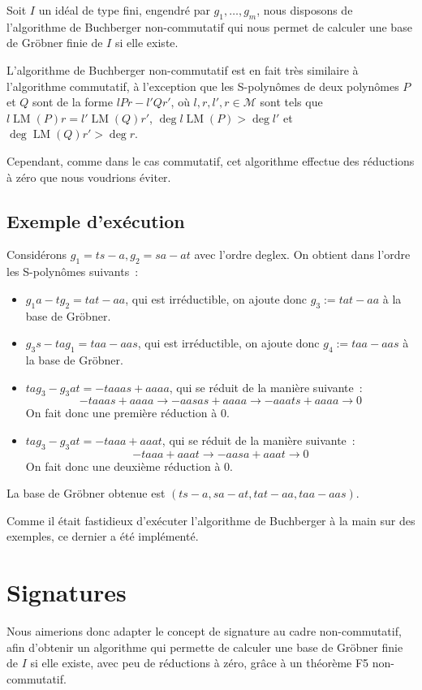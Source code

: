 \documentclass{article}
\newcommand{\M}{\mathcal{M}}
\DeclareMathOperator{\LM}{LM}
\begin{document}
Soit $I$ un idéal de type fini, engendré par $g_1, \dots, g_m$, nous disposons de l'algorithme de Buchberger non-commutatif qui nous permet de calculer une base de Gröbner finie de $I$ si elle existe. 

L'algorithme de Buchberger non-commutatif est en fait très similaire à l'algorithme commutatif, à l'exception que les S-polynômes de deux polynômes $P$ et $Q$ sont de la forme $lPr - l'Qr'$, où $l, r, l', r \in \M$ sont tels que $l\LM(P)r = l'\LM(Q)r'$, $\deg{l\LM(P)} > \deg{l'}$ et $\deg{\LM(Q)r'} > \deg{r}$.

Cependant, comme dans le cas commutatif, cet algorithme effectue des réductions à zéro que nous voudrions éviter.

\subsection*{Exemple d'exécution}

Considérons $g_1 = ts - a, g_2 = sa - at$ avec l'ordre deglex.
On obtient dans l'ordre les S-polynômes suivants~:
\begin{itemize}
\item $g_1 a - t g_2 = tat - aa$, qui est irréductible, on ajoute donc $g_3 := tat - aa$ à la base de Gröbner.
\item $g_3 s - ta g_1 = taa - aas$, qui est irréductible, on ajoute donc $g_4 := taa - aas$ à la base de Gröbner.
\item $ta g_3 - g_3 at = -taaas + aaaa$, qui se réduit de la manière suivante~:
$$-taaas + aaaa \rightarrow -aasas + aaaa \rightarrow -aaats + aaaa \rightarrow 0$$
On fait donc une première réduction à $0$.
\item $ta g_3 - g_3 at = -taaa + aaat$, qui se réduit de la manière suivante~:
$$-taaa + aaat \rightarrow -aasa + aaat \rightarrow 0$$
On fait donc une deuxième réduction à $0$.
\end{itemize}
La base de Gröbner obtenue est $(ts - a, sa - at, tat - aa, taa - aas)$.

Comme il était fastidieux d'exécuter l'algorithme de Buchberger à la main sur des exemples, ce dernier a été implémenté.

\section*{Signatures}

Nous aimerions donc adapter le concept de signature au cadre non-commutatif, afin d'obtenir un algorithme qui permette de calculer une base de Gröbner finie de $I$ si elle existe, avec peu de réductions à zéro, grâce à un théorème F5 non-commutatif.
\end{document}

